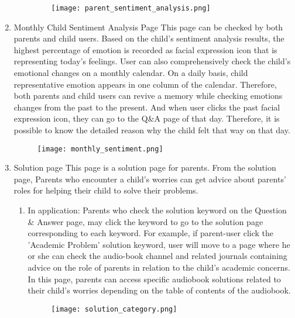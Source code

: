 \documentclass[conference]{IEEEtran}
\begin{document}
\begin{enumerate}
\begin{enumerate}
                \begin{figure}[H]
                 \centering
                 \texttt{[image: parent\_sentiment\_analysis.png]}
                 \end{figure}
            \end{enumerate}
            \item Monthly Child Sentiment Analysis Page \hfill \break
            This page can be checked by both parents and child users. Based on the child's sentiment analysis results, the highest percentage of emotion is recorded as facial expression icon that is representing today's feelings. User can also comprehensively check the child's emotional changes on a monthly calendar. On a daily basis, child representative emotion appears in one column of the calendar. Therefore, both parents and child users can revive a memory while checking emotions changes from the past to the present. And when user clicks the past facial expression icon, they can go to the Q\&A page of that day. Therefore, it is possible to know the detailed reason why the child felt that way on that day.
            \begin{figure}[H]
                 \centering
                 \texttt{[image: monthly\_sentiment.png]}
                 \end{figure}
            \item Solution page \hfill \break
            This page is a solution page for parents. From the solution page, Parents who encounter a child's worries can get advice about parents' roles for helping their child to solve their problems.
            \begin{enumerate}
                \item In application:
                Parents who check the solution keyword on the Question \& Answer page, may click the keyword to go to the solution page corresponding to each keyword. For example, if parent-user click the 'Academic Problem' solution keyword, user will move to a page where he or she can check the audio-book channel and related journals containing advice on the role of parents in relation to the child's academic concerns. In this page, parents can access specific audiobook solutions related to their child's worries depending on the table of contents of the audiobook.
                \begin{figure}[H]
                 \centering
                 \texttt{[image: solution\_category.png]}
                 \end{figure}

\end{enumerate}
\end{enumerate}
\end{document}
